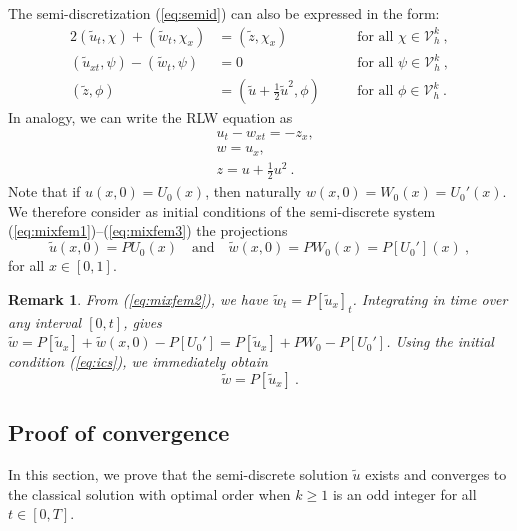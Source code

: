 \documentclass{amsart}
\newcommand{\tu}{\tilde{u}}
\newcommand{\tw}{\tilde{w}}
\newcommand{\tz}{\tilde{z}}
\newtheorem{remark}{Remark}[section]
\begin{document}
The semi-discretization (\ref{eq:semid}) can also be expressed in the form:
\begin{alignat}{2}
(\tu_t,\chi)+(\tw_t,\chi_x)&=(\tz,\chi_x) & & \quad \text{for all $\chi\in \mathcal{V}_h^k$}\ ,\label{eq:mixfem1}\\
(\tu_{xt},\psi)-(\tw_t,\psi) &= 0 & & \quad \text{for all $\psi\in \mathcal{V}_h^k$}\ ,\label{eq:mixfem2}\\
(\tz,\phi)&=(\tu+\tfrac{1}{2}\tu^2,\phi)& & \quad \text{for all $\phi\in \mathcal{V}_h^k$}\ .\label{eq:mixfem3}
\end{alignat}
%
In analogy, we can write the RLW equation as
%
\begin{align}
& u_t-w_{xt}=-z_x,\label{eq:bbmn1}\\
& w = u_x, \label{eq:bbmn2}\\
& z = u+\tfrac{1}{2}u^2\ . \label{eq:bbmn3}
\end{align}
%
Note that if $u(x,0)=U_0(x)$, then naturally $w(x,0)=W_0(x)=U_0'(x)$. 
%
We therefore consider as initial conditions of the semi-discrete system (\ref{eq:mixfem1})--(\ref{eq:mixfem3}) the projections
\begin{equation}\label{eq:ics}
\tilde{u}(x,0)=PU_0(x)\quad \text{and}\quad  \tilde{w}(x,0)=PW_0(x)=P[U_0'](x)\ ,
\end{equation}
for all $x\in[0,1]$.

\begin{remark}\label{rmk:doubleu}
From (\ref{eq:mixfem2}), we have $\tilde{w}_t={P[\tilde{u}_x]}_t$. Integrating in time over any interval $[0,t]$, gives  $\tilde{w}=P[\tilde{u}_x]+\tilde{w}(x,0)-P[U_0']=P[\tilde{u}_x]+PW_0-P[U_0']$. Using the initial condition (\ref{eq:ics}), we immediately obtain 
\begin{equation}\label{eq:doubleu}
\tilde{w}=P[\tilde{u}_x]\ .
\end{equation}
\end{remark}

\subsection{Proof of convergence}

In this section, we prove that the semi-discrete solution $\tilde{u}$ exists and converges to the classical solution with optimal order when $k\geq 1$ is an odd integer for all $t\in[0,T]$.
\end{document}
